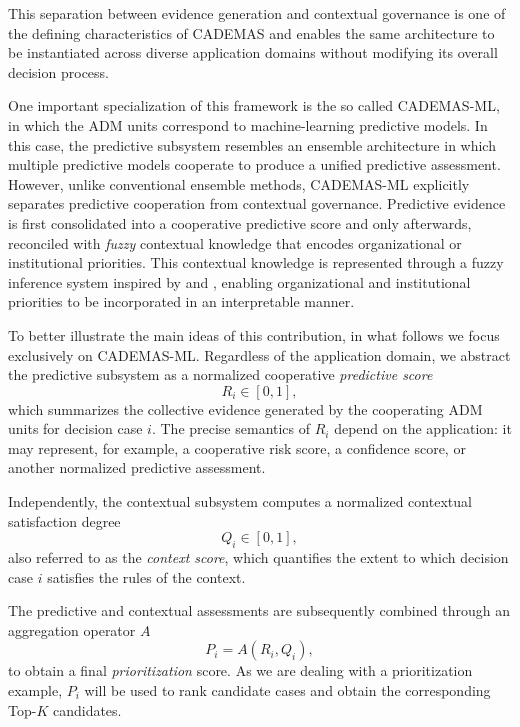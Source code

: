 \documentclass[mathematics,article,submit,moreauthors]{Definitions/mdpi}
\begin{document}
This separation between evidence generation and contextual governance is one of the defining characteristics of CADEMAS and enables the same architecture to be instantiated across diverse application domains without modifying its overall decision process.

One important specialization of this framework is the so called CADEMAS-ML, in which the ADM units correspond to machine-learning predictive models. In this case, the predictive subsystem resembles an ensemble architecture in which multiple predictive models cooperate to produce a unified predictive assessment. However, unlike conventional ensemble methods, CADEMAS-ML explicitly separates predictive cooperation from contextual governance. Predictive evidence is first consolidated into a cooperative predictive score and only afterwards, reconciled with \textit{fuzzy} contextual knowledge that encodes organizational or institutional priorities.  This contextual knowledge is represented through a fuzzy inference system inspired by  \citet{PerezCanedo2022} and \citet{PerezCanedo2024}, enabling organizational and institutional priorities to be incorporated in an interpretable manner.

To better illustrate the main ideas of this contribution, in what follows we focus exclusively on CADEMAS-ML. Regardless of the application domain, we abstract the predictive subsystem as a normalized cooperative
\emph{predictive score}
\begin{equation}
R_i \in [0,1],
\end{equation}
which summarizes the collective evidence generated by the cooperating ADM units for decision case $i$. The precise semantics of $R_i$ depend on the application: it may represent, for example, a cooperative risk score, a confidence score, or another normalized predictive assessment.

Independently, the contextual subsystem computes a normalized contextual satisfaction degree
\begin{equation}
Q_i \in [0,1],
\end{equation}
also referred to as the \emph{context score}, which quantifies the extent to which decision case $i$ satisfies the rules of the context.

The predictive and contextual assessments are subsequently combined through an aggregation operator $A$
\begin{equation}
P_i = A(R_i,Q_i),
\end{equation}
to obtain a final \textit{prioritization} score. As we are dealing with a prioritization example, $P_i$ will be used to rank candidate cases and obtain the corresponding Top-$K$ candidates.
\end{document}
